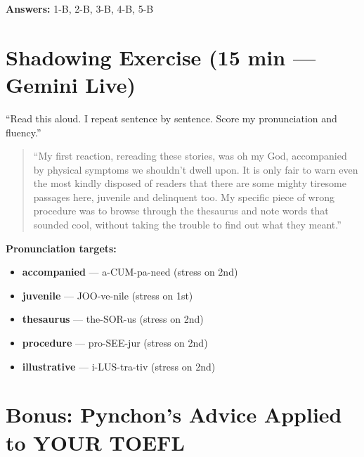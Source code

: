 \documentclass[10pt,a4paper]{article}
\begin{document}
\textbf{Answers:} 1-B, 2-B, 3-B, 4-B, 5-B

\section*{Shadowing Exercise (15 min --- Gemini Live)}

\begin{tcolorbox}[colback=white, colframe=black,
    title=Tell Gemini Live:]
``Read this aloud. I repeat sentence by sentence.
Score my pronunciation and fluency.''
\end{tcolorbox}

\begin{quote}\small
``My first reaction, rereading these stories, was oh my God,
accompanied by physical symptoms we shouldn't dwell upon. It is only
fair to warn even the most kindly disposed of readers that there are
some mighty tiresome passages here, juvenile and delinquent too. My
specific piece of wrong procedure was to browse through the thesaurus
and note words that sounded cool, without taking the trouble to find
out what they meant.''
\end{quote}

\textbf{Pronunciation targets:}
\begin{itemize}[nosep]
\item \textbf{accompanied} --- a-CUM-pa-need (stress on 2nd)
\item \textbf{juvenile} --- JOO-ve-nile (stress on 1st)
\item \textbf{thesaurus} --- the-SOR-us (stress on 2nd)
\item \textbf{procedure} --- pro-SEE-jur (stress on 2nd)
\item \textbf{illustrative} --- i-LUS-tra-tiv (stress on 2nd)
\end{itemize}

\section*{Bonus: Pynchon's Advice Applied to YOUR TOEFL}
\end{document}
